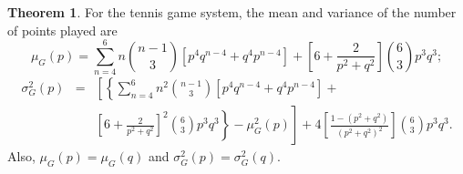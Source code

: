 \documentclass[11pt]{article}
\theoremstyle{plain}
\theoremstyle{definition}
\newtheorem{theorem}{Theorem}[section]
\begin{document}
\begin{theorem}
\label{theo: mean and variance for game number of points}
For the tennis game system, the mean and variance of the number of points played are
%
$$\mu_G(p) = \sum_{n=4}^6 n {{n-1} \choose 3} \left[p^4q^{n-4} + q^4p^{n-4}\right] +
    \left[6 + \frac{2}{p^2+q^2}\right] {6 \choose 3} p^3q^3;$$
%
%
\begin{eqnarray*}
        \sigma_G^2(p) 
        & = & \left[\left\{ \sum_{n=4}^6 n^2 {{n-1} \choose 3} \left[p^4q^{n-4} + q^4p^{n-4}\right] \right.\right. + \\ && \left.\left. \left[6 + \frac{2}{p^2+q^2}\right]^2 {6 \choose 3} p^3q^3\right\} - \mu_G^2(p)\right] + 4 \left[\frac{1-(p^2+q^2)}{(p^2+q^2)^2}\right] {6 \choose 3} p^3q^3.
    \end{eqnarray*}
%
Also, $\mu_G(p) = \mu_G(q)$ and $\sigma_G^2(p) = \sigma_G^2(q).$
\end{theorem}
\end{document}
